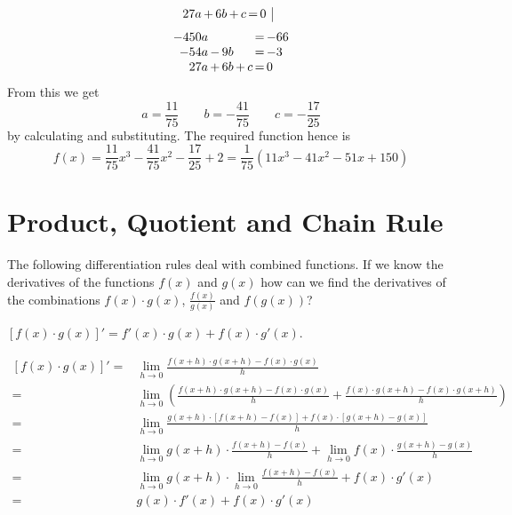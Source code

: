 \documentclass[12pt,eng]{skript_ogg}
\begin{document}
\begin{beispiel}
\[\begin{array}{r@{\,}c@{\,}r@{\,}c@{\,}r@{\,}c@{\,}l|l}
27a  & + & 6b  & + & c & = & 0  &
\end{array}\]
\[\begin{array}{r@{\,}c@{\,}r@{\,}c@{\,}r@{\,}c@{\,}l}
-450a &   &     &   &   & = & -66 \\
-54a  & - & 9b  &   &   & = & -3 \\
27a   & + & 6b  & + & c & = & 0  
\end{array}\]
From this we get 
\[a=\frac{11}{75}\qquad b=-\frac{41}{75}\qquad c=-\frac{17}{25}\]
by calculating and substituting. The required function hence is
\[f(x)=\frac{11}{75}x^3-\frac{41}{75}x^2-\frac{17}{25}+2=\frac{1}{75}(11x^3-41x^2-51x+150)\]
\end{beispiel}

\newpage

\section{Product, Quotient and Chain Rule}
The following differentiation rules deal with combined functions. If we know the derivatives of the functions $f(x)$ and $g(x)$ how can we find the derivatives of the combinations $f(x)\cdot g(x)$, $\frac{f(x)}{g(x)}$ and $f(g(x))$?
\begin{satz}$\left[f(x)\cdot g(x)\right]'=f'(x)\cdot
  g(x)+f(x)\cdot g'(x)$.
\end{satz}
\begin{beweis}
\begin{align*}
\left[f(x)\cdot g(x)\right]'=&\lim_{h\rightarrow
  0}\frac{f(x+h)\cdot g(x+h)-f(x)\cdot g(x)}{h} \\
=&\lim_{h\rightarrow
  0}\left( \frac{f(x+h)\cdot g(x+h)-f(x)\cdot g(x)}{h}+\frac{f(x)\cdot
  g(x+h)-f(x)\cdot g(x+h)}{h}\right) \\
=&\lim_{h\rightarrow
  0}\frac{g(x+h)\cdot
  \left[f(x+h)-f(x)\right]+f(x)\cdot\left[g(x+h)-g(x)\right]}{h} \\
=&\lim_{h\rightarrow 0} g(x+h)\cdot
\frac{f(x+h)-f(x)}{h}+\lim_{h\rightarrow 0} f(x)\cdot
\frac{g(x+h)-g(x)}{h} \\
=&\lim_{h\rightarrow 0}g(x+h)\cdot\lim_{h\rightarrow
  0}\frac{f(x+h)-f(x)}{h}+f(x)\cdot g'(x) \\
=&g(x)\cdot f'(x)+f(x)\cdot g'(x)
\end{align*}
\end{beweis}
\end{document}
